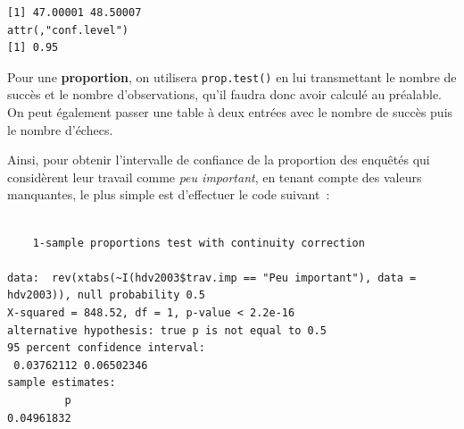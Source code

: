 \documentclass[
  letterpaper,
  DIV=11,
  numbers=noendperiod,
  oneside]{scrreprt}
\newenvironment{Shaded}{\begin{snugshade}}{\end{snugshade}}
\newcommand{\AttributeTok}[1]{\textcolor[rgb]{0.40,0.45,0.13}{#1}}
\newcommand{\ConstantTok}[1]{\textcolor[rgb]{0.56,0.35,0.01}{#1}}
\newcommand{\FunctionTok}[1]{\textcolor[rgb]{0.28,0.35,0.67}{#1}}
\newcommand{\NormalTok}[1]{\textcolor[rgb]{0.00,0.23,0.31}{#1}}
\newcommand{\SpecialCharTok}[1]{\textcolor[rgb]{0.37,0.37,0.37}{#1}}
\newcommand{\StringTok}[1]{\textcolor[rgb]{0.13,0.47,0.30}{#1}}
\begin{document}
\begin{Shaded}
\end{Shaded}

\begin{verbatim}
[1] 47.00001 48.50007
attr(,"conf.level")
[1] 0.95
\end{verbatim}

Pour une \textbf{proportion}, on utilisera \texttt{prop.test()} en lui
transmettant le nombre de succès et le nombre d'observations, qu'il
faudra donc avoir calculé au préalable. On peut également passer une
table à deux entrées avec le nombre de succès puis le nombre d'échecs.

Ainsi, pour obtenir l'intervalle de confiance de la proportion des
enquêtés qui considèrent leur travail comme \emph{peu important}, en
tenant compte des valeurs manquantes, le plus simple est d'effectuer le
code suivant~:

\begin{Shaded}
\end{Shaded}

\begin{verbatim}

    1-sample proportions test with continuity correction

data:  rev(xtabs(~I(hdv2003$trav.imp == "Peu important"), data = hdv2003)), null probability 0.5
X-squared = 848.52, df = 1, p-value < 2.2e-16
alternative hypothesis: true p is not equal to 0.5
95 percent confidence interval:
 0.03762112 0.06502346
sample estimates:
         p 
0.04961832 
\end{verbatim}
\end{document}
